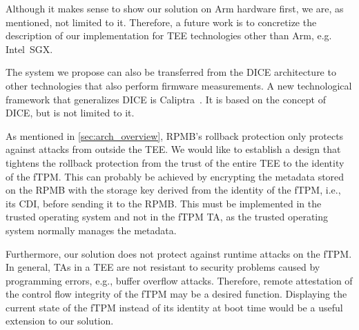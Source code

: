 Although it makes sense to show our solution on Arm hardware first, we are, as mentioned, not limited to it.
Therefore, a future work is to concretize the description of our implementation for TEE technologies other than Arm, e.g. Intel~SGX\@.

The system we propose can also be transferred from the DICE architecture to other technologies that also perform firmware measurements.
A new technological framework that generalizes DICE is Caliptra~\cite{caliptra}.
It is based on the concept of DICE, but is not limited to it.

As mentioned in \autoref{sec:arch_overview}, RPMB's rollback protection only protects against attacks from outside the TEE\@.
We would like to establish a design that tightens the rollback protection from the trust of the entire TEE to the identity of the fTPM\@.
This can probably be achieved by encrypting the metadata stored on the RPMB with the storage key derived from the identity of the fTPM, i.e., its CDI, before sending it to the RPMB\@.
This must be implemented in the trusted operating system and not in the fTPM TA, as the trusted operating system normally manages the metadata.

Furthermore, our solution does not protect against runtime attacks on the fTPM\@.
In general, \acp{TA} in a TEE are not resistant to security problems caused by programming errors, e.g., buffer overflow attacks.
Therefore, remote attestation of the control flow integrity of the fTPM may be a desired function.
Displaying the current state of the fTPM instead of its identity at boot time would be a useful extension to our solution.

